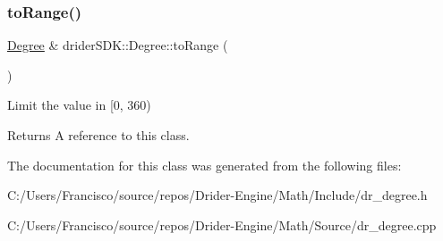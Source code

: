 \subsubsection{\texorpdfstring{to\+Range()}{toRange()}}
{\footnotesize\ttfamily \hyperlink{classdrider_s_d_k_1_1_degree}{Degree} \& drider\+S\+D\+K\+::\+Degree\+::to\+Range (\begin{DoxyParamCaption}{ }\end{DoxyParamCaption})}

Limit the value in \mbox{[}0, 360)

\begin{DoxyReturn}{Returns}
A reference to this class. 
\end{DoxyReturn}


The documentation for this class was generated from the following files\+:\begin{DoxyCompactItemize}
\item 
C\+:/\+Users/\+Francisco/source/repos/\+Drider-\/\+Engine/\+Math/\+Include/dr\+\_\+degree.\+h\item 
C\+:/\+Users/\+Francisco/source/repos/\+Drider-\/\+Engine/\+Math/\+Source/dr\+\_\+degree.\+cpp\end{DoxyCompactItemize}
